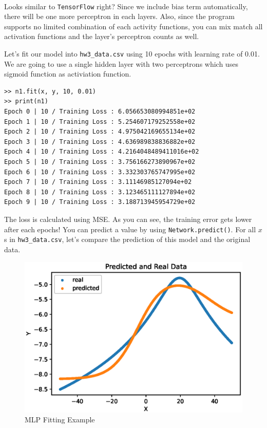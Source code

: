 \documentclass{homework}
\newenvironment{code}{\captionsetup{type=listing}}{}
\begin{document}
\\
Looks similar to \texttt{TensorFlow} right? Since we include bias term automatically, there will be one more perceptron in each layers. Also, since the program supports no limited combination of each activity functions, you can mix match all activation functions and the layer's perceptron counts as well. 

Let's fit our model into \texttt{hw3_data.csv} using 10 epochs with learning rate of 0.01. We are going to use a single hidden layer with two perceptrons which uses sigmoid function as activiation function.
\\

\begin{center}
\begin{code}
\begin{verbatim}
>> n1.fit(x, y, 10, 0.01)
>> print(n1)
Epoch 0 | 10 / Training Loss : 6.056653080994851e+02
Epoch 1 | 10 / Training Loss : 5.254607179252558e+02
Epoch 2 | 10 / Training Loss : 4.975042169655134e+02
Epoch 3 | 10 / Training Loss : 4.636989838836882e+02
Epoch 4 | 10 / Training Loss : 4.2164048489411016e+02
Epoch 5 | 10 / Training Loss : 3.756166273890967e+02
Epoch 6 | 10 / Training Loss : 3.332303765747995e+02
Epoch 7 | 10 / Training Loss : 3.11146985127094e+02
Epoch 8 | 10 / Training Loss : 3.123465111127894e+02
Epoch 9 | 10 / Training Loss : 3.188713945954729e+02
\end{verbatim}
\end{code}
\end{center}

The loss is calculated using MSE. As you can see, the training error gets lower after each epochs! You can predict a value by using \texttt{Network.predict()}. For all $x$s in \texttt{hw3_data.csv}, let's compare the prediction of this model and the original data. 

\begin{figure}[h]
  \centering
  \includegraphics[scale=0.7]{multi_layer_demo_1.eps}
  \caption{MLP Fitting Example}
\end{figure}
\end{document}
